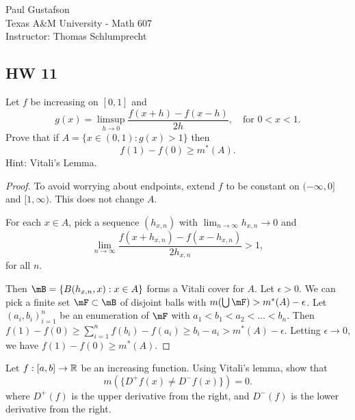 \documentclass{article}
\begin{document}
\noindent Paul Gustafson\\
\noindent Texas A\&M University - Math 607\\ 
\noindent Instructor: Thomas Schlumprecht

\subsection*{HW 11} 
 Let $f$ be increasing on $[0,1]$ and 
$$
g(x) = \limsup_{h\to 0} \frac{f(x+h) - f(x-h)}{2h}, \quad 
\text{for $0 < x < 1$.}
$$
Prove that if $A = \{x \in (0,1) : g(x) > 1\}$ then
$$
f(1) -f(0) \ge m^*(A).
$$
Hint: Vitali's Lemma.

\begin{proof}
To avoid worrying about endpoints, extend $f$ to be constant on $(-\infty, 0]$ and $[1, \infty)$. This does not change $A$.

For each $x \in A$, pick a sequence $(h_{x,n})$ with $\lim_{n \to \infty} h_{x,n} \to 0$ and
$$
\lim_{n \to \infty} \frac { f(x + h_{x,n}) - f(x - h_{x,n})}{2 h_{x,n}} > 1,
$$
for all $n$.

Then $\mB = \{B(h_{x,n}, x) : x \in A\}$ forms a Vitali cover for $A$.  Let $\epsilon > 0$. 
We can pick a finite set $\mF \subset \mB$ of disjoint balls with $m(\bigcup \mF) > m^*(A) - \epsilon$.
Let $(a_i,b_i)_{i=1}^n$ be an enumeration of $\mF$ with $a_1 < b_1 < a_2 < \ldots < b_n$.  Then
$f(1) - f(0) \ge \sum_{i=1}^n f(b_i) - f(a_i) \ge b_i - a_i > m^*(A) - \epsilon$.  Letting $\epsilon \to 0$, we have $f(1) - f(0) \ge m^*(A)$.
\end{proof}


 Let $f : [a,b] \to \mathbb{R}$ be an increasing function. Using Vitali's lemma, show that 
$$
m(\{D^+f(x) \neq D^-f(x)\}) = 0.
$$
where $D^+(f)$ is the upper derivative from the right, and $D^-(f)$ is the lower derivative from the right.
\end{document}
